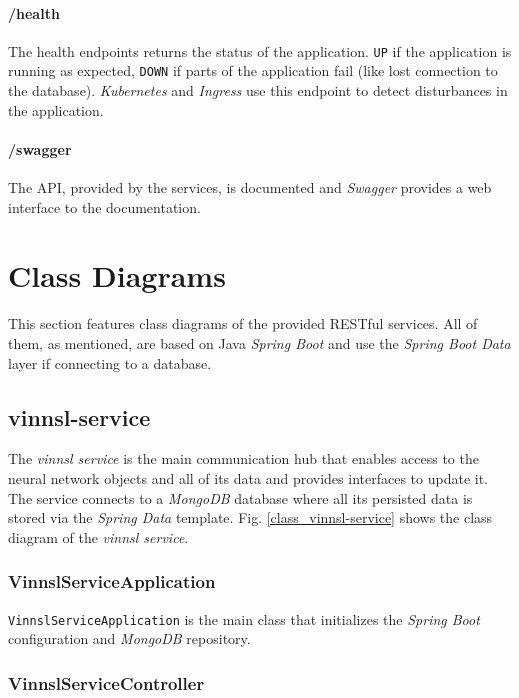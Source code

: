 \paragraph{/health}\label{health}

The health endpoints returns the status of the application. \texttt{UP}
if the application is running as expected, \texttt{DOWN} if parts of the
application fail (like lost connection to the database).
\emph{Kubernetes} and \emph{Ingress} use this endpoint to detect
disturbances in the application.

\paragraph{/swagger}\label{swagger-1}

The API, provided by the services, is documented and \emph{Swagger}
provides a web interface to the documentation.

\section{Class Diagrams}\label{class-diagrams}

This section features class diagrams of the provided RESTful services.
All of them, as mentioned, are based on Java \emph{Spring Boot} and use
the \emph{Spring Boot Data} layer if connecting to a database.

\subsection{vinnsl-service}\label{vinnsl-service-1}

The \emph{vinnsl service} is the main communication hub that enables
access to the neural network objects and all of its data and provides
interfaces to update it. The service connects to a \emph{MongoDB}
database where all its persisted data is stored via the \emph{Spring
Data} template. Fig. \ref{class_vinnsl-service} shows the class diagram
of the \emph{vinnsl service}.

\subsubsection{VinnslServiceApplication}\label{vinnslserviceapplication}

\texttt{VinnslServiceApplication} is the main class that initializes the
\emph{Spring Boot} configuration and \emph{MongoDB} repository.

\subsubsection{VinnslServiceController}\label{vinnslservicecontroller}

